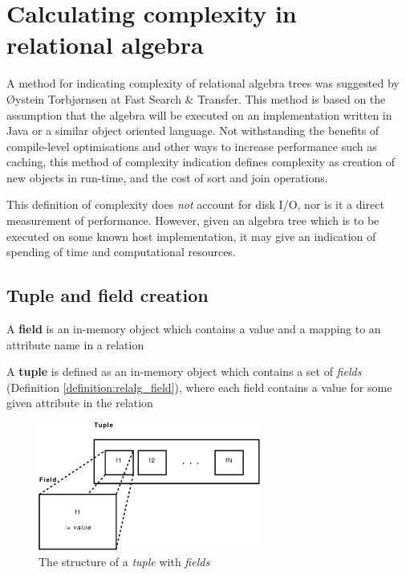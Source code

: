 \section{Calculating complexity in relational algebra}
\label{sect:method:complexity}
A method for indicating complexity of relational algebra trees was suggested
by \O ystein Torbj\o rnsen at Fast Search \& Transfer. This method is based on the assumption
that the algebra will be executed on an implementation written in Java or a
similar object oriented language. Not withstanding the
benefits of compile-level optimisations and other ways to increase performance
such as caching, this method of complexity indication defines complexity as
creation of new objects in run-time, and the cost of sort and join operations.

This definition of complexity does \textit{not} account
for disk I/O, nor is it a direct measurement of performance. However, given
an algebra tree which is to be executed on some known host implementation, it
may give an indication of spending of time and computational resources.

\subsection{Tuple and field creation}

\begin{myDefinition}
A \textbf{field} is an in-memory object which contains a value and a mapping to
an attribute name in a relation
\label{definition:relalg_field}
\end{myDefinition}

\begin{myDefinition}
A \textbf{tuple} is defined as an in-memory object which contains a set of
\textit{fields} (Definition \ref{definition:relalg_field}), where each field
contains a value for some given attribute in the relation
\label{definition:relalg_tuple}
\end{myDefinition}

\begin{figure}[!htp]
\begin{center}
  \includegraphics[width=0.65\textwidth]{diagrams/tuple_post}
  \caption[Tuple/Field structure]{The structure of a \textit{tuple} with
  \textit{fields}}
  \label{fig:method:tuple_field}
\end{center}
\end{figure}

